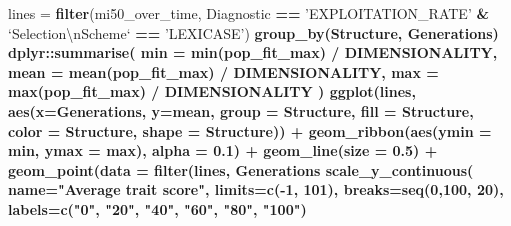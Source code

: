 \documentclass[]{book}
\newenvironment{Shaded}{\begin{snugshade}}{\end{snugshade}}
\newcommand{\CharTok}[1]{\textcolor[rgb]{0.31,0.60,0.02}{#1}}
\newcommand{\DataTypeTok}[1]{\textcolor[rgb]{0.13,0.29,0.53}{#1}}
\newcommand{\DecValTok}[1]{\textcolor[rgb]{0.00,0.00,0.81}{#1}}
\newcommand{\FloatTok}[1]{\textcolor[rgb]{0.00,0.00,0.81}{#1}}
\newcommand{\KeywordTok}[1]{\textcolor[rgb]{0.13,0.29,0.53}{\textbf{#1}}}
\newcommand{\NormalTok}[1]{#1}
\newcommand{\OperatorTok}[1]{\textcolor[rgb]{0.81,0.36,0.00}{\textbf{#1}}}
\newcommand{\StringTok}[1]{\textcolor[rgb]{0.31,0.60,0.02}{#1}}
\begin{document}
\begin{Shaded}
\begin{Highlighting}[]
\NormalTok{lines =}\StringTok{ }\KeywordTok{filter}\NormalTok{(mi50_over_time, Diagnostic }\OperatorTok{==}\StringTok{ 'EXPLOITATION_RATE'} \OperatorTok{&}\StringTok{ `}\DataTypeTok{Selection}\CharTok{\textbackslash{}n}\DataTypeTok{Scheme}\StringTok{`} \OperatorTok{==}\StringTok{ 'LEXICASE'}\NormalTok{) }\OperatorTok{%>%}
\StringTok{  }\KeywordTok{group_by}\NormalTok{(Structure, Generations) }\OperatorTok{%>%}
\StringTok{  }\NormalTok{dplyr}\OperatorTok{::}\KeywordTok{summarise}\NormalTok{(}
    \DataTypeTok{min =} \KeywordTok{min}\NormalTok{(pop_fit_max) }\OperatorTok{/}\StringTok{ }\NormalTok{DIMENSIONALITY,}
    \DataTypeTok{mean =} \KeywordTok{mean}\NormalTok{(pop_fit_max) }\OperatorTok{/}\StringTok{ }\NormalTok{DIMENSIONALITY,}
    \DataTypeTok{max =} \KeywordTok{max}\NormalTok{(pop_fit_max) }\OperatorTok{/}\StringTok{ }\NormalTok{DIMENSIONALITY}
\NormalTok{  )}
\KeywordTok{ggplot}\NormalTok{(lines, }\KeywordTok{aes}\NormalTok{(}\DataTypeTok{x=}\NormalTok{Generations, }\DataTypeTok{y=}\NormalTok{mean, }\DataTypeTok{group =}\NormalTok{ Structure, }\DataTypeTok{fill =}\NormalTok{ Structure, }\DataTypeTok{color =}\NormalTok{ Structure, }\DataTypeTok{shape =}\NormalTok{ Structure)) }\OperatorTok{+}
\StringTok{  }\KeywordTok{geom_ribbon}\NormalTok{(}\KeywordTok{aes}\NormalTok{(}\DataTypeTok{ymin =}\NormalTok{ min, }\DataTypeTok{ymax =}\NormalTok{ max), }\DataTypeTok{alpha =} \FloatTok{0.1}\NormalTok{) }\OperatorTok{+}
\StringTok{  }\KeywordTok{geom_line}\NormalTok{(}\DataTypeTok{size =} \FloatTok{0.5}\NormalTok{) }\OperatorTok{+}
\StringTok{  }\KeywordTok{geom_point}\NormalTok{(}\DataTypeTok{data =} \KeywordTok{filter}\NormalTok{(lines, Generations }\OperatorTok{%%}\StringTok{ }\DecValTok{2000} \OperatorTok{==}\StringTok{ }\DecValTok{0}\NormalTok{), }\DataTypeTok{size =} \FloatTok{2.5}\NormalTok{, }\DataTypeTok{stroke =} \FloatTok{2.0}\NormalTok{, }\DataTypeTok{alpha =} \FloatTok{1.0}\NormalTok{) }\OperatorTok{+}
\StringTok{  }\KeywordTok{scale_y_continuous}\NormalTok{(}
    \DataTypeTok{name=}\StringTok{"Average trait score"}\NormalTok{,}
    \DataTypeTok{limits=}\KeywordTok{c}\NormalTok{(}\OperatorTok{-}\DecValTok{1}\NormalTok{, }\DecValTok{101}\NormalTok{),}
    \DataTypeTok{breaks=}\KeywordTok{seq}\NormalTok{(}\DecValTok{0}\NormalTok{,}\DecValTok{100}\NormalTok{, }\DecValTok{20}\NormalTok{),}
    \DataTypeTok{labels=}\KeywordTok{c}\NormalTok{(}\StringTok{"0"}\NormalTok{, }\StringTok{"20"}\NormalTok{, }\StringTok{"40"}\NormalTok{, }\StringTok{"60"}\NormalTok{, }\StringTok{"80"}\NormalTok{, }\StringTok{"100"}\NormalTok{)}
}}}
\end{Highlighting}
\end{Shaded}
\end{document}
